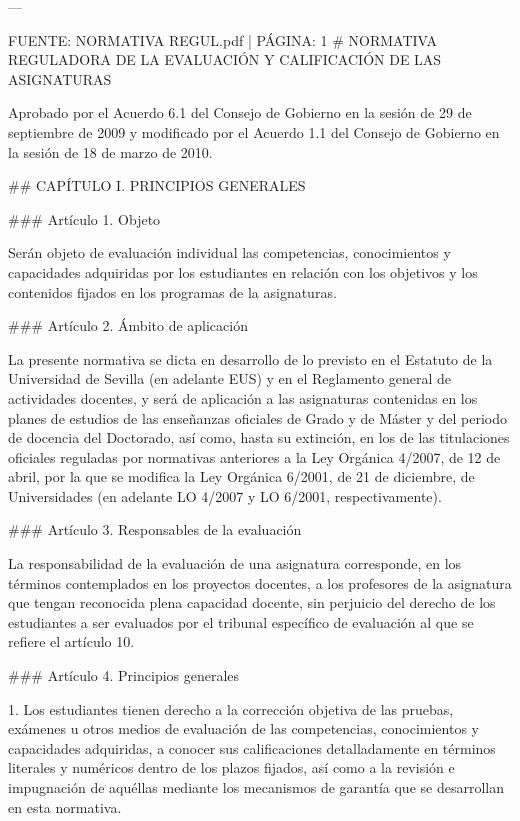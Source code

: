 \documentclass{article}
\begin{document}
\begin{itemize}
\begin{itemize}
\begin{scriptsize}
                  ---

                  FUENTE: NORMATIVA REGUL.pdf | PÁGINA: 1
                  \# NORMATIVA REGULADORA DE LA EVALUACIÓN Y CALIFICACIÓN DE LAS ASIGNATURAS

                  Aprobado por el Acuerdo 6.1 del Consejo de Gobierno en la sesión de 29 de septiembre de 2009 y modificado por el Acuerdo 1.1 del Consejo de Gobierno en la sesión de 18 de marzo de 2010.

                  \#\# CAPÍTULO I. PRINCIPIOS GENERALES

                  \#\#\# Artículo 1. Objeto

                  Serán objeto de evaluación individual las competencias, conocimientos y capacidades adquiridas por los estudiantes en relación con los objetivos y los contenidos fijados en los programas de la asignaturas.

                  \#\#\# Artículo 2. Ámbito de aplicación

                  La presente normativa se dicta en desarrollo de lo previsto en el Estatuto de la Universidad de Sevilla (en adelante EUS) y en el Reglamento general de actividades docentes, y será de aplicación a las asignaturas contenidas en los planes de estudios de las enseñanzas oficiales de Grado y de Máster y del periodo de docencia del Doctorado, así como, hasta su extinción, en los de las titulaciones oficiales reguladas por normativas anteriores a la Ley Orgánica 4/2007, de 12 de abril, por la que se modifica la Ley Orgánica 6/2001, de 21 de diciembre, de Universidades (en adelante LO 4/2007 y LO 6/2001, respectivamente).

                  \#\#\# Artículo 3. Responsables de la evaluación

                  La responsabilidad de la evaluación de una asignatura corresponde, en los términos contemplados en los proyectos docentes, a los profesores de la asignatura que tengan reconocida plena capacidad docente, sin perjuicio del derecho de los estudiantes a ser evaluados por el tribunal específico de evaluación al que se refiere el artículo 10.

                  \#\#\# Artículo 4. Principios generales

                  1. Los estudiantes tienen derecho a la corrección objetiva de las pruebas, exámenes u otros medios de evaluación de las competencias, conocimientos y capacidades adquiridas, a conocer sus calificaciones detalladamente en términos literales y numéricos dentro de los plazos fijados, así como a la revisión e impugnación de aquéllas mediante los mecanismos de garantía que se desarrollan en esta normativa.


\end{scriptsize}
\end{itemize}
\end{itemize}
\end{document}
